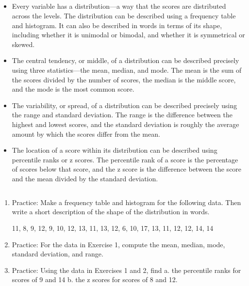 \subsection{}
\begin{fullwidth}
\begin{itemize}
\item Every variable has a distribution---a way that the scores are distributed across the levels. The distribution can be described using a frequency table and histogram. It can also be described in words in terms of its shape, including whether it is unimodal or bimodal, and whether it is symmetrical or skewed.

\item The central tendency, or middle, of a distribution can be described precisely using three statistics---the mean, median, and mode. The mean is the sum of the scores divided by the number of scores, the median is the middle score, and the mode is the most common score.

\item The variability, or spread, of a distribution can be described precisely using the range and standard deviation. The range is the difference between the highest and lowest scores, and the standard deviation is roughly the average amount by which the scores differ from the mean.

\item The location of a score within its distribution can be described using percentile ranks or z scores. The percentile rank of a score is the percentage of scores below that score, and the z score is the difference between the score and the mean divided by the standard deviation. 
\end{itemize}
\end{fullwidth}

 

\subsection{}
\begin{fullwidth}
\begin{enumerate}
\item Practice: Make a frequency table and histogram for the following data. Then write a short description of the shape of the distribution in words.


11, 8, 9, 12, 9, 10, 12, 13, 11, 13, 12, 6, 10, 17, 13, 11, 12, 12, 14, 14
    

\item Practice: For the data in Exercise 1, compute the mean, median, mode, standard deviation, and range.


\item Practice: Using the data in Exercises 1 and 2, find
a. the percentile ranks for scores of 9 and 14 b. the z scores for scores of 8 and 12.

\end{enumerate}
\end{fullwidth}  


